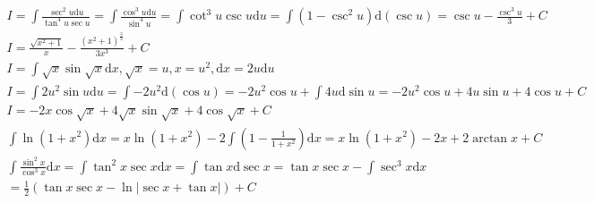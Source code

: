 \documentclass{article}
\begin{document}
\begin{align*}
    I = \int \frac{\sec^2 u \mathrm{d}u}{\tan^4 u \sec u} = \int \frac{\cos^3 u\mathrm{d}u}{\sin^4 u} = \int \cot^3 u \csc u\mathrm{d}u = \int (1-\csc^2 u) \mathrm{d}(\csc u) = \csc u - \frac{\csc^3 u}{3} + C \\ 
    I = \frac{\sqrt{x^2+1}}{x} - \frac{(x^2+1)^{\frac{3}{2}}}{3x^3} + C \\
    I = \int \sqrt{x}\sin \sqrt{x} \mathrm{d}x , \sqrt{x} = u, x = u^2 , \mathrm{d}x = 2u\mathrm{d}u \\
    I = \int 2u^2\sin u \mathrm{d}u = \int -2u^2\mathrm{d}(\cos u) = -2u^2\cos u + \int 4u \mathrm{d}\sin u = -2u^2\cos u+ 4u\sin u + 4 \cos u + C \\ 
    I = -2x\cos \sqrt{x}+4\sqrt{x}\sin \sqrt{x} + 4\cos \sqrt{x} + C \\
    \int \ln(1+x^2)\mathrm{d}x = x\ln(1+x^2) - 2\int \left( 1 - \frac{1}{1+x^2}\right) \mathrm{d}x = x\ln(1+x^2)-2x+ 2\arctan x + C \\
    \int \frac{\sin^2 x}{\cos^3 x}\mathrm{d}x = \int \tan^2 x \sec x \mathrm{d}x = \int \tan x \mathrm{d} \sec x = \tan x \sec x - \int \sec^3 x \mathrm{d}x \\ 
    = \frac{1}{2}(\tan x\sec x  - \ln|\sec x + \tan x|) + C\\
\end{align*}
\end{document}
